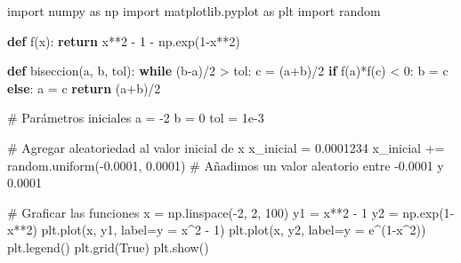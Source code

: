 \documentclass[
  letterpaper,
  DIV=11,
  numbers=noendperiod]{scrartcl}
\newenvironment{Shaded}{\begin{snugshade}}{\end{snugshade}}
\newcommand{\CommentTok}[1]{\textcolor[rgb]{0.37,0.37,0.37}{#1}}
\newcommand{\ControlFlowTok}[1]{\textcolor[rgb]{0.00,0.23,0.31}{\textbf{#1}}}
\newcommand{\DecValTok}[1]{\textcolor[rgb]{0.68,0.00,0.00}{#1}}
\newcommand{\FloatTok}[1]{\textcolor[rgb]{0.68,0.00,0.00}{#1}}
\newcommand{\ImportTok}[1]{\textcolor[rgb]{0.00,0.46,0.62}{#1}}
\newcommand{\KeywordTok}[1]{\textcolor[rgb]{0.00,0.23,0.31}{\textbf{#1}}}
\newcommand{\NormalTok}[1]{\textcolor[rgb]{0.00,0.23,0.31}{#1}}
\newcommand{\OperatorTok}[1]{\textcolor[rgb]{0.37,0.37,0.37}{#1}}
\newcommand{\StringTok}[1]{\textcolor[rgb]{0.13,0.47,0.30}{#1}}
\newcommand{\VariableTok}[1]{\textcolor[rgb]{0.07,0.07,0.07}{#1}}
\begin{document}
\begin{Shaded}
\begin{Highlighting}[]
\ImportTok{import}\NormalTok{ numpy }\ImportTok{as}\NormalTok{ np}
\ImportTok{import}\NormalTok{ matplotlib.pyplot }\ImportTok{as}\NormalTok{ plt}
\ImportTok{import}\NormalTok{ random}

\KeywordTok{def}\NormalTok{ f(x):}
    \ControlFlowTok{return}\NormalTok{ x}\OperatorTok{**}\DecValTok{2} \OperatorTok{{-}} \DecValTok{1} \OperatorTok{{-}}\NormalTok{ np.exp(}\DecValTok{1}\OperatorTok{{-}}\NormalTok{x}\OperatorTok{**}\DecValTok{2}\NormalTok{)}

\KeywordTok{def}\NormalTok{ biseccion(a, b, tol):}
    \ControlFlowTok{while}\NormalTok{ (b}\OperatorTok{{-}}\NormalTok{a)}\OperatorTok{/}\DecValTok{2} \OperatorTok{\textgreater{}}\NormalTok{ tol:}
\NormalTok{        c }\OperatorTok{=}\NormalTok{ (a}\OperatorTok{+}\NormalTok{b)}\OperatorTok{/}\DecValTok{2}
        \ControlFlowTok{if}\NormalTok{ f(a)}\OperatorTok{*}\NormalTok{f(c) }\OperatorTok{\textless{}} \DecValTok{0}\NormalTok{:}
\NormalTok{            b }\OperatorTok{=}\NormalTok{ c}
        \ControlFlowTok{else}\NormalTok{:}
\NormalTok{            a }\OperatorTok{=}\NormalTok{ c}
    \ControlFlowTok{return}\NormalTok{ (a}\OperatorTok{+}\NormalTok{b)}\OperatorTok{/}\DecValTok{2}

\CommentTok{\# Parámetros iniciales}
\NormalTok{a }\OperatorTok{=} \OperatorTok{{-}}\DecValTok{2}
\NormalTok{b }\OperatorTok{=} \DecValTok{0}
\NormalTok{tol }\OperatorTok{=} \FloatTok{1e{-}3}

\CommentTok{\# Agregar aleatoriedad al valor inicial de x}
\NormalTok{x\_inicial }\OperatorTok{=} \FloatTok{0.0001234}
\NormalTok{x\_inicial }\OperatorTok{+=}\NormalTok{ random.uniform(}\OperatorTok{{-}}\FloatTok{0.0001}\NormalTok{, }\FloatTok{0.0001}\NormalTok{)  }\CommentTok{\# Añadimos un valor aleatorio entre {-}0.0001 y 0.0001}

\CommentTok{\# Graficar las funciones}
\NormalTok{x }\OperatorTok{=}\NormalTok{ np.linspace(}\OperatorTok{{-}}\DecValTok{2}\NormalTok{, }\DecValTok{2}\NormalTok{, }\DecValTok{100}\NormalTok{)}
\NormalTok{y1 }\OperatorTok{=}\NormalTok{ x}\OperatorTok{**}\DecValTok{2} \OperatorTok{{-}} \DecValTok{1}
\NormalTok{y2 }\OperatorTok{=}\NormalTok{ np.exp(}\DecValTok{1}\OperatorTok{{-}}\NormalTok{x}\OperatorTok{**}\DecValTok{2}\NormalTok{)}
\NormalTok{plt.plot(x, y1, label}\OperatorTok{=}\StringTok{\textquotesingle{}y = x\^{}2 {-} 1\textquotesingle{}}\NormalTok{)}
\NormalTok{plt.plot(x, y2, label}\OperatorTok{=}\StringTok{\textquotesingle{}y = e\^{}(1{-}x\^{}2)\textquotesingle{}}\NormalTok{)}
\NormalTok{plt.legend()}
\NormalTok{plt.grid(}\VariableTok{True}\NormalTok{)}
\NormalTok{plt.show()}

\end{Highlighting}
\end{Shaded}
\end{document}
